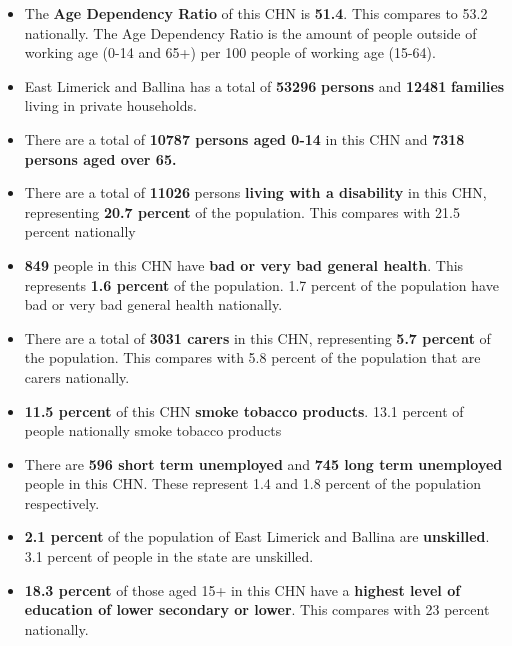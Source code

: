 \documentclass{article}
\begin{document}
\begin{itemize}

\item The \textbf{Age Dependency Ratio} of this CHN is  \textbf{51.4}. This compares to 53.2 nationally. The Age Dependency Ratio is the amount of people outside of working age (0-14 and 65+) per 100 people of working age (15-64). 

\item East Limerick and Ballina has a total of \textbf{\num{53296}} \textbf{persons} and  \textbf{\num{12481}} \textbf{families} living in private households.

\item There are a total of \textbf{\num{10787} persons aged 0-14} in this CHN and \textbf{\num{7318} persons aged over 65.} 

\item There are a total of \textbf{\num{11026}} persons \textbf{living with a disability} in this CHN, representing \textbf{20.7 percent} of the population. This compares with  21.5 percent nationally

\item \textbf{\num{849}} people in this CHN have \textbf{bad or very bad general health}. This represents \textbf{1.6 percent} of the population. 1.7 percent of the population have bad or very bad general health nationally. 

\item There are a total of \textbf{\num{3031} carers} in this CHN, representing \textbf{5.7 percent} of the population. This compares with 5.8 percent of the population that are carers nationally. 

\item \textbf{11.5 percent} of this CHN \textbf{smoke tobacco products}. 13.1 percent of people nationally smoke tobacco products

\item There are \textbf{\num{596} short term unemployed} and \textbf{\num{745} long term unemployed} people in this CHN. These represent 1.4 and 1.8 percent of the population respectively.

\item  \textbf{2.1 percent} of the population of East Limerick and Ballina are \textbf{unskilled}. 3.1 percent of people in the state are unskilled.

\item \textbf{18.3 percent} of those aged 15+ in this CHN have a \textbf{highest level of education of lower secondary or lower}. This compares with 23 percent nationally. 


\end{itemize}
\end{document}
